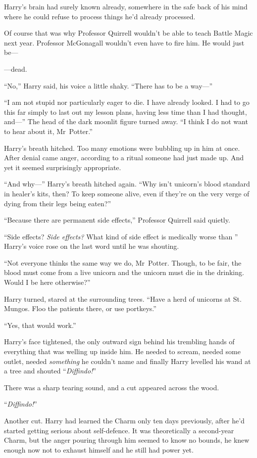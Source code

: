 Harry’s brain had surely known already, somewhere in the safe back of his mind where he could refuse to process things he’d already processed.

Of course that was why Professor Quirrell wouldn’t be able to teach Battle Magic next year. Professor McGonagall wouldn’t even have to fire him. He would just be—

—dead.

“No,” Harry said, his voice a little shaky. “There has to be a way—”

“I am not stupid nor particularly eager to die. I have already looked. I had to go this far simply to last out my lesson plans, having less time than I had thought, and—” The head of the dark moonlit figure turned away. “I think I do not want to hear about it, Mr~Potter.”

Harry’s breath hitched. Too many emotions were bubbling up in him at once. After denial came anger, according to a ritual someone had just made up. And yet it seemed surprisingly appropriate.

“And why—” Harry’s breath hitched again. “Why isn’t unicorn’s blood standard in healer’s kits, then? To keep someone alive, even if they’re on the very verge of dying from their legs being eaten?”

“Because there are permanent side effects,” Professor Quirrell said quietly.

“Side effects? \emph{Side effects?} What kind of side effect is medically worse than ” Harry’s voice rose on the last word until he was shouting.

“Not everyone thinks the same way we do, Mr~Potter. Though, to be fair, the blood must come from a live unicorn and the unicorn must die in the drinking. Would I be here otherwise?”

Harry turned, stared at the surrounding trees. “Have a herd of unicorns at St. Mungos. Floo the patients there, or use portkeys.”

“Yes, that would work.”

Harry’s face tightened, the only outward sign behind his trembling hands of everything that was welling up inside him. He needed to scream, needed some outlet, needed \emph{something} he couldn’t name and finally Harry levelled his wand at a tree and shouted “\emph{Diffindo!}”

There was a sharp tearing sound, and a cut appeared across the wood.

“\emph{Diffindo!}”

Another cut. Harry had learned the Charm only ten days previously, after he’d started getting serious about self-defence. It was theoretically a second-year Charm, but the anger pouring through him seemed to know no bounds, he knew enough now not to exhaust himself and he still had power yet.

